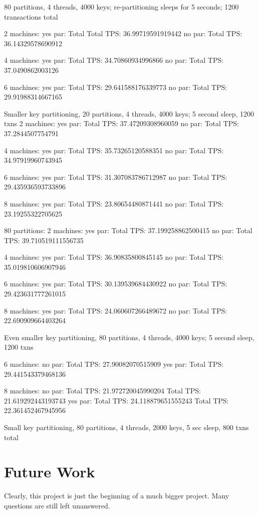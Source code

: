\documentclass[a4paper, 10pt, notitlepage]{article}
\begin{document}
80 partitions, 4 threads, 4000 keys; re-partitioning sleeps for 5 seconds; 1200 transactions total

2 machines:
yes par: Total Total TPS: 36.99719591919442
no par: Total TPS: 36.14329578690912

4 machines:
yes par: Total TPS: 34.70860934996866
no par: Total TPS: 37.0490862003126

6 machines:
yes par: Total TPS: 29.641588176339773
no par: Total TPS: 29.91988314667165

Smaller key partitioning, 20 partitions, 4 threads, 4000 keys; 5 second sleep, 1200 txns
2 machines:
yes par: Total TPS: 37.47209308960059
no par: Total TPS: 37.2844507754791

4 machines:
yes par: Total TPS: 35.73265120588351
no par: Total TPS: 34.97919960743945

6 machines:
yes par: Total TPS: 31.307083786712987
no par: Total TPS: 29.435936593733896

8 machines:
yes par: Total TPS: 23.80654480871441
no par: Total TPS: 23.19255322705625

80 partitions:
2 machines:
yes par: Total TPS: 37.199258862500415
no par: Total TPS: 39.710519111556735 

4 machines:
yes par: Total TPS: 36.90835800845145
no par: Total TPS: 35.019810606907946

6 machines:
yes par: Total TPS: 30.139539684430922
no par: Total TPS: 29.423631777261015

8 machines:
yes par: Total TPS: 24.060607266489672
no par: Total TPS: 22.690909664403264

Even smaller key partitioning, 80 partitions, 4 threads, 4000 keys; 5 second sleep, 1200 txns

6 machines:
no par: Total TPS: 27.90082070515909
yes par: Total TPS: 29.441543379468136

8 machines:
no par: 
Total TPS: 21.972720045990204
Total TPS: 21.619292443193743
yes par: 
Total TPS: 24.118879651555243
Total TPS: 22.361452467945956

Small key partitioning, 80 partitions, 4 threads, 2000 keys, 5 sec sleep, 800 txns total

\fi

\section{Future Work}

Clearly, this project is just the beginning of a much bigger project. Many questions are still left unanswered. 
\end{document}
